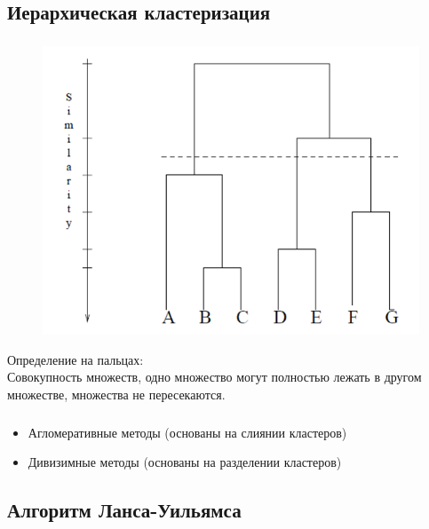\documentclass[t,aspectratio=169]{beamer}  %
\begin{document}
\subsection{Иерархическая кластеризация}

\begin{frame}
    \frametitle{\insertsection} 
    \framesubtitle{\insertsubsection}
    \begin{figure}
        \includegraphics[width=\linewidth]{Agglomerative_clustering_dendogram.png} %
    \end{figure}
    Определение на пальцах:\\
    Совокупность множеств, одно множество могут полностью лежать в другом множестве, множества не пересекаются.
\end{frame}

\begin{frame}
    \frametitle{\insertsection} 
    \framesubtitle{\insertsubsection}
    \begin{itemize}
        \item Агломеративные методы (основаны на слиянии кластеров)
        \item Дивизимные методы  (основаны на разделении кластеров)
    \end{itemize}
\end{frame}

\subsection{Алгоритм Ланса-Уильямса}
\end{document}
